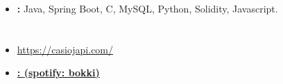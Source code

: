 \documentclass[10pt,a4paper]{moderncv}
\begin{document}
\begin{itemize}
  
    \item \textbf{:} Java, Spring Boot, C, MySQL, Python, Solidity, Javascript.

\end{itemize}


\section{}

\begin{itemize}
    \item {\href{https://maximosantoro.com/}{\textbf{}https://casiojapi.com/}}
    \item \textbf{{\href{https://open.spotify.com/artist/1gmAvUNIqrPSGklxtoj514?si=zmeSuhggQwSlc_M0m4N1xA}{{{: }}(spotify: bokki)}}}
  
\end{itemize}


\end{document}

